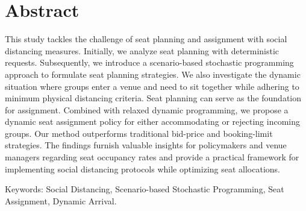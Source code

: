 
\section*{Abstract}
This study tackles the challenge of seat planning and assignment with social distancing measures. Initially, we analyze seat planning with deterministic requests. Subsequently, we introduce a scenario-based stochastic programming approach to formulate seat planning strategies. We also investigate the dynamic situation where groups enter a venue and need to sit together while adhering to minimum physical distancing criteria. Seat planning can serve as the foundation for assignment. Combined with relaxed dynamic programming, we propose a dynamic seat assignment policy for either accommodating or rejecting incoming groups. Our method outperforms traditional bid-price and booking-limit strategies. The findings furnish valuable insights for policymakers and venue managers regarding seat occupancy rates and provide a practical framework for implementing social distancing protocols while optimizing seat allocations.


Keywords: Social Distancing, Scenario-based Stochastic Programming, Seat Assignment, Dynamic Arrival.


